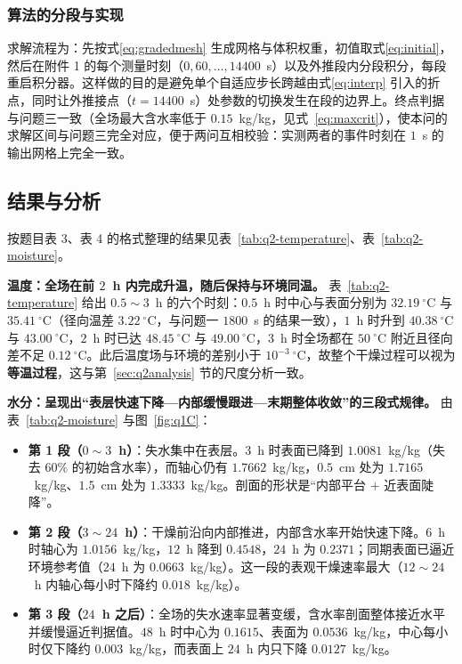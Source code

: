 \subsubsection{算法的分段与实现}

求解流程为：先按式\eqref{eq:gradedmesh} 生成网格与体积权重，初值取式\eqref{eq:initial}，然后在附件 1 的每个测量时刻（$0,60,\ldots,14400$~s）以及外推段内分段积分，每段重启积分器。这样做的目的是避免单个自适应步长跨越由式\eqref{eq:interp} 引入的折点，同时让外推接点（$t=14400$~s）处参数的切换发生在段的边界上。终点判据与问题三一致（全场最大含水率低于 $0.15$~kg/kg，见式~\eqref{eq:maxcrit}），使本问的求解区间与问题三完全对应，便于两问互相校验：实测两者的事件时刻在 $1$~s 的输出网格上完全一致。

\subsection{结果与分析}

按题目表 3、表 4 的格式整理的结果见表~\ref{tab:q2-temperature}、表~\ref{tab:q2-moisture}。


\textbf{温度：全场在前 $2$~h 内完成升温，随后保持与环境同温。} 表~\ref{tab:q2-temperature} 给出 $0.5\sim3$~h 的六个时刻：$0.5$~h 时中心与表面分别为 $32.19~^\circ$C 与 $35.41~^\circ$C（径向温差 $3.22~^\circ$C，与问题一 $1800$~s 的结果一致），$1$~h 时升到 $40.38~^\circ$C 与 $43.00~^\circ$C，$2$~h 时已达 $48.45~^\circ$C 与 $49.00~^\circ$C，$3$~h 时全场都在 $50~^\circ$C 附近且径向差不足 $0.12~^\circ$C。此后温度场与环境的差别小于 $10^{-3}~^\circ$C，故整个干燥过程可以视为\textbf{等温过程}，这与第~\ref{sec:q2analysis} 节的尺度分析一致。


\textbf{水分：呈现出``表层快速下降—内部缓慢跟进—末期整体收敛''的三段式规律。} 由表~\ref{tab:q2-moisture} 与图~\ref{fig:q1C}：

\begin{itemize}
  \item \textbf{第 1 段（$0\sim3$~h）}：失水集中在表层。$3$~h 时表面已降到 $1.0081$~kg/kg（失去 $60\%$ 的初始含水率），而轴心仍有 $1.7662$~kg/kg，$0.5$~cm 处为 $1.7165$~kg/kg、$1.5$~cm 处为 $1.3333$~kg/kg。剖面的形状是``内部平台 $+$ 近表面陡降''。
  \item \textbf{第 2 段（$3\sim24$~h）}：干燥前沿向内部推进，内部含水率开始快速下降。$6$~h 时轴心为 $1.0156$~kg/kg，$12$~h 降到 $0.4548$，$24$~h 为 $0.2371$；同期表面已逼近环境参考值（$24$~h 为 $0.0663$~kg/kg）。这一段的表观干燥速率最大（$12\sim24$~h 内轴心每小时下降约 $0.018$~kg/kg）。
  \item \textbf{第 3 段（$24$~h 之后）}：全场的失水速率显著变缓，含水率剖面整体接近水平并缓慢逼近判据值。$48$~h 时中心为 $0.1615$、表面为 $0.0536$~kg/kg，中心每小时仅下降约 $0.003$~kg/kg，而表面上 $24$~h 内只下降 $0.0127$~kg/kg。
\end{itemize}


